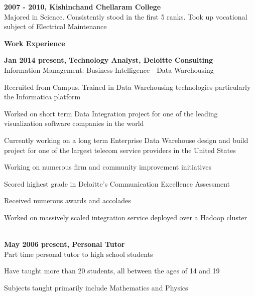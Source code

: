 \documentclass[a4paper,12pt,final]{memoir}
\newcommand{\SmallSep}{\vspace{0.5em}}
\newcommand{\CVSection}[1]
	{\Large\textbf{#1}\par
	\SmallSep\normalsize\normalfont}
\newcommand{\CVItem}[1]
	{\textbf{\color{Plum} #1}}
\begin{document}
\CVItem{2007 - 2010, Kishinchand Chellaram College}\\
Majored in Science. Consistently stood in the first 5 ranks. Took up \allowbreak vocational subject of Electrical Maintenance
\SmallSep

\CVSection{Work Experience}
\CVItem{Jan 2014 \textendash \space present, Technology Analyst, Deloitte Consulting}\\
\SmallSep
Information Management: Business Intelligence - Data Warehousing\\
\begin{minipage}{13cm}
\begin{compactitem}[\color{Plum}$\circ$]
	{\footnotesize
		\item Recruited from Campus. Trained in Data Warehousing technologies particularly the Informatica platform
		\item Worked on short term Data Integration project for one of the leading visualization software companies in the world
		\item Currently working on a long term Enterprise Data Warehouse design and build project for one of the largest telecom service providers in the United States
		\item Working on numerous firm and community improvement initiatives
		\item Scored highest grade in Deloitte's Communication Excellence Assessment
		\item Received numerous awards and accolades
		\item Worked on massively scaled integration service deployed over a Hadoop cluster
}
\end{compactitem}
\end{minipage}
\SmallSep\\
\CVItem{May 2006 \textendash \space present, Personal Tutor}\\
\SmallSep
Part time personal tutor to high school students\\
\begin{minipage}{13cm}
	\begin{compactitem}[\color{Plum}$\circ$]
		{\footnotesize
			\item Have taught more than 20 students, all between the ages of 14 and 19
			\item Subjects taught primarily include Mathematics and Physics}
	\end{compactitem}
\end{minipage}
\SmallSep
\end{document}
